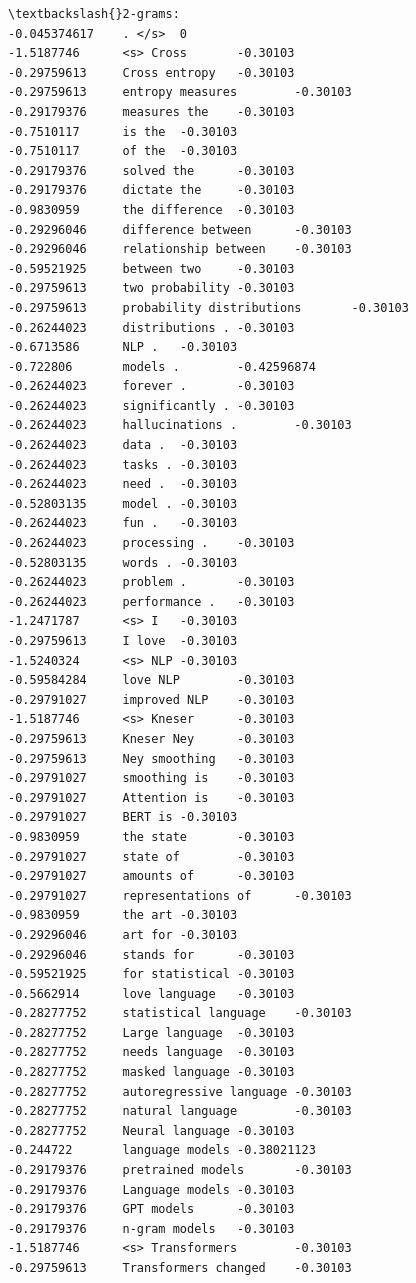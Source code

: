\documentclass[11pt]{article}
\begin{document}
\begin{Verbatim}[commandchars=\\\{\}]
\textbackslash{}2-grams:
-0.045374617    . </s>  0
-1.5187746      <s> Cross       -0.30103
-0.29759613     Cross entropy   -0.30103
-0.29759613     entropy measures        -0.30103
-0.29179376     measures the    -0.30103
-0.7510117      is the  -0.30103
-0.7510117      of the  -0.30103
-0.29179376     solved the      -0.30103
-0.29179376     dictate the     -0.30103
-0.9830959      the difference  -0.30103
-0.29296046     difference between      -0.30103
-0.29296046     relationship between    -0.30103
-0.59521925     between two     -0.30103
-0.29759613     two probability -0.30103
-0.29759613     probability distributions       -0.30103
-0.26244023     distributions . -0.30103
-0.6713586      NLP .   -0.30103
-0.722806       models .        -0.42596874
-0.26244023     forever .       -0.30103
-0.26244023     significantly . -0.30103
-0.26244023     hallucinations .        -0.30103
-0.26244023     data .  -0.30103
-0.26244023     tasks . -0.30103
-0.26244023     need .  -0.30103
-0.52803135     model . -0.30103
-0.26244023     fun .   -0.30103
-0.26244023     processing .    -0.30103
-0.52803135     words . -0.30103
-0.26244023     problem .       -0.30103
-0.26244023     performance .   -0.30103
-1.2471787      <s> I   -0.30103
-0.29759613     I love  -0.30103
-1.5240324      <s> NLP -0.30103
-0.59584284     love NLP        -0.30103
-0.29791027     improved NLP    -0.30103
-1.5187746      <s> Kneser      -0.30103
-0.29759613     Kneser Ney      -0.30103
-0.29759613     Ney smoothing   -0.30103
-0.29791027     smoothing is    -0.30103
-0.29791027     Attention is    -0.30103
-0.29791027     BERT is -0.30103
-0.9830959      the state       -0.30103
-0.29791027     state of        -0.30103
-0.29791027     amounts of      -0.30103
-0.29791027     representations of      -0.30103
-0.9830959      the art -0.30103
-0.29296046     art for -0.30103
-0.29296046     stands for      -0.30103
-0.59521925     for statistical -0.30103
-0.5662914      love language   -0.30103
-0.28277752     statistical language    -0.30103
-0.28277752     Large language  -0.30103
-0.28277752     needs language  -0.30103
-0.28277752     masked language -0.30103
-0.28277752     autoregressive language -0.30103
-0.28277752     natural language        -0.30103
-0.28277752     Neural language -0.30103
-0.244722       language models -0.38021123
-0.29179376     pretrained models       -0.30103
-0.29179376     Language models -0.30103
-0.29179376     GPT models      -0.30103
-0.29179376     n-gram models   -0.30103
-1.5187746      <s> Transformers        -0.30103
-0.29759613     Transformers changed    -0.30103

\end{Verbatim}
\end{document}
